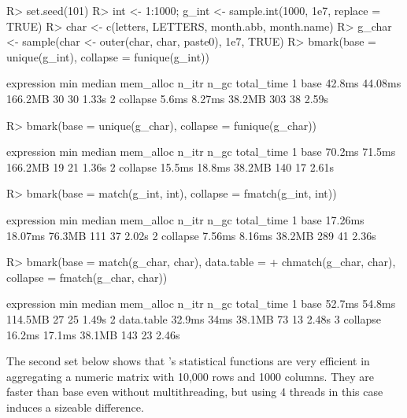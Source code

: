 \documentclass[nojss]{jss} %
\begin{document}
\begin{Schunk}
\begin{Sinput}
R> set.seed(101)
R> int <- 1:1000; g_int <- sample.int(1000, 1e7, replace = TRUE)
R> char <- c(letters, LETTERS, month.abb, month.name)
R> g_char <- sample(char <- outer(char, char, paste0), 1e7, TRUE)
R> bmark(base = unique(g_int), collapse = funique(g_int))
\end{Sinput}
\begin{Soutput}
  expression    min  median mem_alloc n_itr n_gc total_time
1       base 42.8ms 44.08ms   166.2MB    30   30      1.33s
2   collapse  5.6ms  8.27ms    38.2MB   303   38      2.59s
\end{Soutput}
\begin{Sinput}
R> bmark(base = unique(g_char), collapse = funique(g_char))
\end{Sinput}
\begin{Soutput}
  expression    min median mem_alloc n_itr n_gc total_time
1       base 70.2ms 71.5ms   166.2MB    19   21      1.36s
2   collapse 15.5ms 18.8ms    38.2MB   140   17      2.61s
\end{Soutput}
\begin{Sinput}
R> bmark(base = match(g_int, int), collapse = fmatch(g_int, int))
\end{Sinput}
\begin{Soutput}
  expression     min  median mem_alloc n_itr n_gc total_time
1       base 17.26ms 18.07ms    76.3MB   111   37      2.02s
2   collapse  7.56ms  8.16ms    38.2MB   289   41      2.36s
\end{Soutput}
\begin{Sinput}
R> bmark(base = match(g_char, char), data.table =
+        chmatch(g_char, char), collapse = fmatch(g_char, char))
\end{Sinput}
\begin{Soutput}
  expression    min median mem_alloc n_itr n_gc total_time
1       base 52.7ms 54.8ms   114.5MB    27   25      1.49s
2 data.table 32.9ms   34ms    38.1MB    73   13      2.48s
3   collapse 16.2ms 17.1ms    38.1MB   143   23      2.46s
\end{Soutput}
\end{Schunk}
%
The second set below shows that 's statistical functions are very efficient in aggregating a numeric matrix with 10,000 rows and 1000 columns. They are faster than base  even without multithreading, but using 4 threads in this case induces a sizeable difference.
\end{document}
